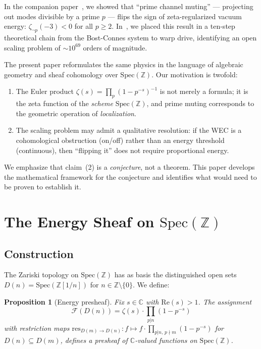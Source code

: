 \documentclass[aps,prd,twocolumn,superscriptaddress,nofootinbib]{revtex4-2}
\newtheorem{proposition}[theorem]{Proposition}
\newcommand{\Spec}{\mathrm{Spec}}
\begin{document}
In the companion paper~\cite{paper_A}, we showed that ``prime channel
muting'' --- projecting out modes divisible by a prime $p$ ---
flips the sign of zeta-regularized vacuum energy:
$\zeta_{\neg p}(-3) < 0$ for all $p \geq 2$.
In~\cite{paper_C}, we placed this result in a ten-step theoretical
chain from the Bost-Connes system to warp drive, identifying an
open scaling problem of $\sim 10^{69}$ orders of magnitude.

The present paper reformulates the same physics in the language
of algebraic geometry and sheaf cohomology over $\Spec(\mathbb{Z})$.
Our motivation is twofold:
\begin{enumerate}
  \item The Euler product $\zeta(s) = \prod_p (1-p^{-s})^{-1}$
    is not merely a formula; it is the zeta function of the
    \emph{scheme} $\Spec(\mathbb{Z})$, and prime muting corresponds
    to the geometric operation of \emph{localization}.
  \item The scaling problem may admit a qualitative resolution:
    if the WEC is a cohomological obstruction (on/off) rather
    than an energy threshold (continuous), then ``flipping it''
    does not require proportional energy.
\end{enumerate}

We emphasize that claim~(2) is a \emph{conjecture}, not a theorem.
This paper develops the mathematical framework for the conjecture
and identifies what would need to be proven to establish it.

\section{The Energy Sheaf on $\Spec(\mathbb{Z})$}
\label{sec:sheaf}

\subsection{Construction}

The Zariski topology on $\Spec(\mathbb{Z})$ has as basis the
distinguished open sets $D(n) = \Spec(\mathbb{Z}[1/n])$ for
$n \in \mathbb{Z} \setminus \{0\}$. We define:

\begin{proposition}[Energy presheaf]
\label{prop:presheaf}
Fix $s \in \mathbb{C}$ with $\mathrm{Re}(s) > 1$.
The assignment
\begin{equation}
  \mathcal{F}(D(n)) = \zeta(s) \cdot \prod_{p | n} (1 - p^{-s})
  \label{eq:energy_sheaf}
\end{equation}
with restriction maps
$\mathrm{res}_{D(m) \to D(n)}: f \mapsto f \cdot \prod_{p|n,\, p \nmid m} (1-p^{-s})$
for $D(n) \subseteq D(m)$, defines a presheaf of
$\mathbb{C}$-valued functions on $\Spec(\mathbb{Z})$.
\end{proposition}
\end{document}
